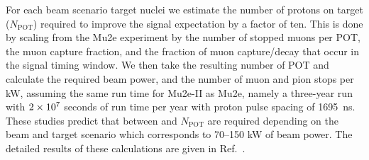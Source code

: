 For each beam scenario target nuclei we estimate the number of protons
on target ($N_{\mathrm{POT}}$) required to improve the signal
expectation by a factor of ten. This is done by scaling from the Mu2e
experiment by the number of stopped muons per POT, the muon capture
fraction, and the fraction of muon capture/decay that occur in the
signal timing window.  We then take the resulting number of POT and
calculate the required beam power, and the number of muon and pion
stops per kW, assuming the same run time for Mu2e-II as Mu2e, namely a
three-year run with $2\times10^{7}$ seconds of run time per year with
proton pulse spacing of 1695~ns.  These studies predict that between
 and  $N_{\mathrm{POT}}$ are required
depending on the beam and target scenario which corresponds to 70--150
kW of beam power.  The detailed results of these calculations are
given in Ref.~\cite{Mu2eII}.




